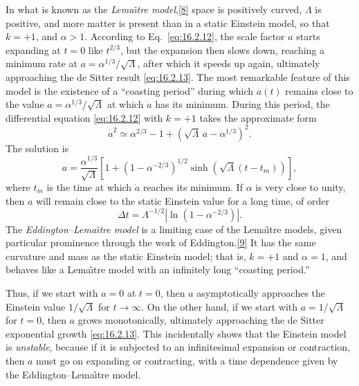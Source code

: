 In what is known as the \emph{Lema\^{\i}tre model},\hyperref[ch16-ref-8]{[8]}
space is positively curved, \(\Lambda\) is positive, and more matter is present
than in a static Einstein model, so that \(k=+1\), and \(\alpha>1\). According
to Eq.~\eqref{eq:16.2.12}, the scale factor \(a\) starts expanding at \(t=0\)
like \(t^{2/3}\), but the expansion then slows down, reaching a minimum rate at
\(a=\alpha^{1/3}/\sqrt{\Lambda}\), after which it speeds up again, ultimately
approaching the de Sitter result \eqref{eq:16.2.13}. The most remarkable
feature of this model is the existence of a ``coasting period'' during which
\(a(t)\) remains close to the value
\(a=\alpha^{1/3}/\sqrt{\Lambda}\) at which \(\dot a\) has its minimum. During
this period, the differential equation \eqref{eq:16.2.12} with \(k=+1\) takes
the approximate form
\[
  \dot a^2
  \simeq
  \alpha^{2/3}-1
  +\left(\sqrt{\Lambda}\,a-\alpha^{1/3}\right)^2.
\]
The solution is
\[
  a
  =
  \frac{\alpha^{1/3}}{\sqrt{\Lambda}}
  \left[
    1
    +(1-\alpha^{-2/3})^{1/2}
    \sinh\!\left(\sqrt{\Lambda}(t-t_m)\right)
  \right],
\]
where \(t_m\) is the time at which \(\dot a\) reaches its minimum. If \(\alpha\)
is very close to unity, then \(a\) will remain close to the static Einstein
value for a long time, of order
\begin{equation}
  \Delta t
  =
  \Lambda^{-1/2}
  \left|\ln(1-\alpha^{-2/3})\right|.
  \tag{16.2.15}\label{eq:16.2.15}
\end{equation}
The \emph{Eddington--Lema\^{\i}tre model} is a limiting case of the
Lema\^{\i}tre models, given particular prominence through the work of
Eddington.\hyperref[ch16-ref-9]{[9]} It has the same curvature and mass as the
static Einstein model; that is, \(k=+1\) and \(\alpha=1\), and behaves like a
Lema\^{\i}tre model with an infinitely long ``coasting period.''

Thus, if we start with \(a=0\) at \(t=0\), then \(a\) asymptotically approaches
the Einstein value \(1/\sqrt{\Lambda}\) for \(t\to\infty\). On the other hand,
if we start with \(a=1/\sqrt{\Lambda}\) for \(t=0\), then \(a\) grows
monotonically, ultimately approaching the de Sitter exponential growth
\eqref{eq:16.2.13}. This incidentally shows that the Einstein model is
\emph{unstable}, because if it is subjected to an infinitesimal expansion or
contraction, then \(a\) must go on expanding or contracting, with a time
dependence given by the Eddington--Lema\^{\i}tre model.

